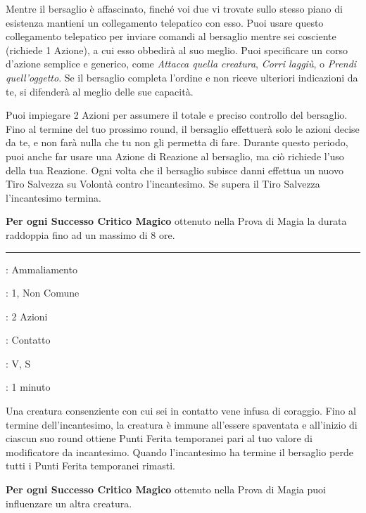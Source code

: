 \begin{multicols}{2}
Mentre il bersaglio è affascinato, finché voi due vi trovate sullo stesso piano di esistenza mantieni un collegamento telepatico con esso. Puoi usare questo collegamento telepatico per inviare comandi al bersaglio mentre sei cosciente (richiede 1 Azione), a cui esso obbedirà al suo meglio. Puoi specificare un corso d'azione semplice e generico, come \emph{Attacca quella creatura}, \emph{Corri laggiù}, o \emph{Prendi quell'oggetto}. Se il bersaglio completa l'ordine e non riceve ulteriori indicazioni da te, si difenderà al meglio delle sue capacità.

Puoi impiegare 2 Azioni per assumere il totale e preciso controllo del bersaglio. Fino al termine del tuo prossimo round, il bersaglio effettuerà solo le azioni decise da te, e non farà nulla che tu non gli permetta di fare. Durante questo periodo, puoi anche far usare una Azione di Reazione al bersaglio, ma ciò richiede l'uso della tua Reazione. Ogni volta che il bersaglio subisce danni effettua un nuovo Tiro Salvezza su Volontà contro l'incantesimo. Se supera il Tiro Salvezza l'incantesimo termina.

\textbf{Per ogni Successo Critico Magico} ottenuto nella Prova di Magia la durata raddoppia fino ad un massimo di 8 ore.

\smallskip\noindent\rule{\linewidth}{2pt} \hypertarget{Eroismo}{}\smallskip{}
\noindent
\begin{description}[noitemsep, topsep=0pt, parsep=0pt, partopsep=0pt, leftmargin=0cm, labelwidth=2.8cm]
	\item[\textbf{Lista di Magia}]: Ammaliamento
	\item[\textbf{Livello}]: 1, Non Comune
	\item[\textbf{T. di Lancio}]: 2 Azioni
	\item[\textbf{Gittata}]: Contatto
	\item[\textbf{Componenti}]: V, S
	\item[\textbf{Durata}]: 1 minuto
\end{description}

Una creatura consenziente con cui sei in contatto vene infusa di coraggio. Fino al termine dell'incantesimo, la creatura è immune all'essere spaventata e all'inizio di ciascun suo round ottiene Punti Ferita temporanei pari al tuo valore di modificatore da incantesimo. Quando l'incantesimo ha termine il bersaglio perde tutti i Punti Ferita temporanei rimasti.

\textbf{Per ogni Successo Critico Magico} ottenuto nella Prova di Magia puoi influenzare un altra creatura.


\end{multicols}
